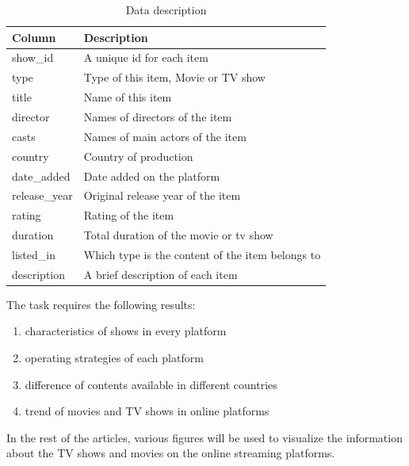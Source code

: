 \documentclass{article}
\begin{document}
\begin{table}[h]
	\centering
	\caption{Data description}
	\label{data_description}
	\begin{tabular}{ll}
	\toprule
	Column        & Description                                      \\ 
	\midrule
	show\_id      & A unique id for each item                        \\
	type          & Type of this item, Movie or TV show              \\
	title         & Name of this item                                \\
	director      & Names of directors of the item                   \\
	casts         & Names of main actors of the item                 \\
	country       & Country of production                            \\
	date\_added   & Date added on the platform                       \\
	release\_year & Original release year of the item                \\
	rating        & Rating of the item                               \\
	duration      & Total duration of the movie or tv show           \\
	listed\_in    & Which type is the content of the item belongs to \\
	description   & A brief description of each item                 \\
	\bottomrule
	\end{tabular}
	\end{table}

The task requires the following results:

\begin{enumerate}
	\item characteristics of shows in every platform
	\item operating strategies of each platform
	\item difference of contents available in different countries
	\item trend of movies and TV shows in online platforms
\end{enumerate}

In the rest of the articles, various figures will be used to visualize the 
information about the TV shows and movies on the online streaming platforms.
\end{document}
